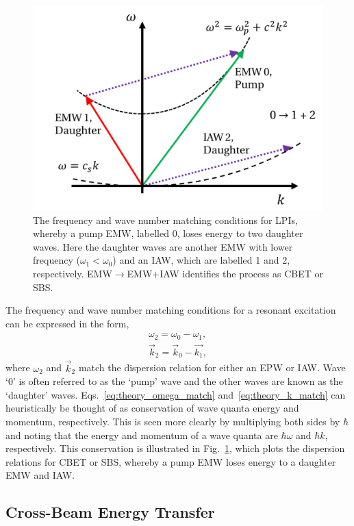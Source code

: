 \begin{figure}[t!]
    \includegraphics[width=0.6\linewidth]{Theory/Images/LPI_conservation_disprel.png}
    \centering
    \caption{The frequency and wave number matching conditions for \ac{LPIs}, whereby a pump \ac{EMW}, labelled 0, loses energy to two daughter waves.
        Here the daughter waves are another \ac{EMW} with lower frequency ($\omega_1<\omega_0$) and an \ac{IAW}, which are labelled 1 and 2, respectively.
        \ac{EMW}$\rightarrow$\ac{EMW}$+$\ac{IAW} identifies the process as \ac{CBET} or \ac{SBS}.
    }%
    \label{fig:theory_LPI_disprel}
\end{figure}

The frequency and wave number matching conditions for a resonant excitation can be expressed in the form,
\begin{align}
    \label{eq:theory_omega_match}
    \omega_2 = \omega_0 - \omega_1,\\
    \label{eq:theory_k_match}
    \vec{k}_2 = \vec{k}_0 - \vec{k_1},
\end{align}
where $\omega_2$ and $\vec{k}_2$ match the dispersion relation for either an \ac{EPW} or \ac{IAW}.
Wave `0' is often referred to as the `pump' wave and the other waves are known as the `daughter' waves.
Eqs.~\ref{eq:theory_omega_match} and~\ref{eq:theory_k_match} can heuristically be thought of as conservation of wave quanta energy and momentum, respectively.
This is seen more clearly by multiplying both sides by $\hbar$ and noting that the energy and momentum of a wave quanta are $\hbar\omega$ and $\hbar k$, respectively.
This conservation is illustrated in Fig.~\ref{fig:theory_LPI_disprel}, which plots the dispersion relations for \ac{CBET} or \ac{SBS}, whereby a pump \ac{EMW} loses energy to a daughter \ac{EMW} and \ac{IAW}.

\subsection{Cross-Beam Energy Transfer}%
\label{sec:theory_CBET}

